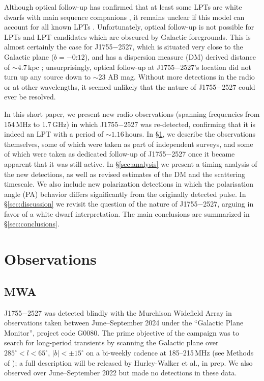 \documentclass[preprint2,linenumbers]{aastex631}
\newcommand{\src}{J1755$-$2527}
\begin{document}
Although optical follow-up has confirmed that at least some LPTs are white dwarfs with main sequence companions \citep{2024arXiv240811536D,2025arXiv250103315R}, it remains unclear if this model can account for all known LPTs \citep[e.g.][]{2022ApJ...940...72R,Lee2025}.
Unfortunately, optical follow-up is not possible for LPTs and LPT candidates which are obscured by Galactic foregrounds.
This is almost certainly the case for \src{}, which is situated very close to the Galactic plane ($b = -0\overset{\circ}{.}12$), and has a dispersion measure (DM) derived distance of ${\sim}4.7\,$kpc ; unsurprisingly, optical follow-up at \src{}'s location did not turn up any source down to ${\sim}23$ AB mag.
Without more detections in the radio or at other wavelengths, it seemed unlikely that the nature of \src{} could ever be resolved.

In this short paper, we present new radio observations (spanning frequencies from $154\,$MHz to $1.7\,$GHz) in which \src{} was re-detected, confirming that it is indeed an LPT with a period of ${\sim}1.16\,$hours.
In \S\ref{sec:observations}, we describe the observations themselves, some of which were taken as part of independent surveys, and some of which were taken as dedicated follow-up of \src{} once it became apparent that it was still active.
In \S\ref{sec:analysis} we present a timing analysis of the new detections, as well as revised estimates of the DM and the scattering timescale.
We also include new polarization detections in which the polarisation angle (PA) behavior differs significantly from the originally detected pulse.
In \S\ref{sec:discussion} we revisit the question of the nature of \src{}, arguing in favor of a white dwarf interpretation.
The main conclusions are summarized in \S\ref{sec:conclusions}.

\section{Observations} \label{sec:observations}

\subsection{MWA} \label{sec:mwa}

\src{} was detected blindly with the Murchison Widefield Array \citep[MWA;][]{Tingay2013} in observations taken between June--September 2024 under the ``Galactic Plane Monitor'', project code G0080. The prime objective of the campaign was to search for long-period transients by scanning the Galactic plane over $285^\circ < l < 65^\circ$, $|b|<\pm15^\circ$ on a bi-weekly cadence at 185--215\,MHz (see Methods of \citet{2023Natur.619..487H}); a full description will be released by Hurley-Walker et al., in prep. We also observed over June--September 2022 but made no detections in these data.
\end{document}
